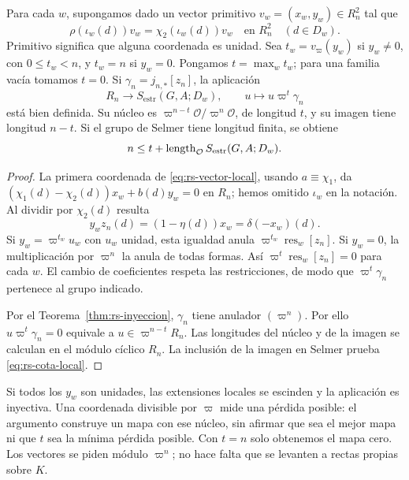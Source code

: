 \begin{proposicion}
\label{prop:rs-local}
Para cada $w$, supongamos dado un vector primitivo
$v_w=(x_w,y_w)\in R_n^2$ tal que
\begin{equation}
 \rho(\iota_w(d))v_w=\chi_2(\iota_w(d))v_w
       \quad\text{en }R_n^2\quad(d\in D_w).
 \label{eq:rs-vector-local}
\end{equation}
Primitivo significa que alguna coordenada es unidad. Sea
$t_w=v_\varpi(y_w)$ si $y_w\ne0$, con $0\le t_w<n$,
y $t_w=n$ si $y_w=0$. Pongamos $t=\max_w t_w$;
para una familia vacía tomamos $t=0$. Si
$\gamma_n=j_{n,*}[z_n]$, la aplicación
\begin{equation}
 R_n\longrightarrow S_{\mathrm{estr}}(G,A;D_w),\qquad
 u\longmapsto u\varpi^t\gamma_n
 \label{eq:rs-mapa-selmer}
\end{equation}
está bien definida. Su núcleo es
$\varpi^{n-t}\mathcal O/\varpi^n\mathcal O$, de longitud $t$,
y su imagen tiene longitud $n-t$. Si el grupo de Selmer tiene
longitud finita, se obtiene
\begin{equation}
 n\le t+\operatorname{length}_{\mathcal O}S_{\mathrm{estr}}(G,A;D_w).
 \label{eq:rs-cota-local}
\end{equation}
\end{proposicion}

\begin{proof}
La primera coordenada de \eqref{eq:rs-vector-local}, usando
$a\equiv\chi_1$, da
$(\chi_1(d)-\chi_2(d))x_w+b(d)y_w=0$ en $R_n$;
hemos omitido $\iota_w$ en la notación. Al dividir por
$\chi_2(d)$ resulta
\begin{equation}
 y_w z_n(d)=(1-\eta(d))x_w=\delta(-x_w)(d).
 \label{eq:rs-coborde-local}
\end{equation}
Si $y_w=\varpi^{t_w}u_w$ con $u_w$ unidad, esta igualdad
anula $\varpi^{t_w}\operatorname{res}_w[z_n]$.
Si $y_w=0$, la multiplicación por $\varpi^n$ la anula de todas
formas. Así $\varpi^t\operatorname{res}_w[z_n]=0$ para cada $w$.
El cambio de coeficientes respeta las restricciones, de modo que
$\varpi^t\gamma_n$ pertenece al grupo indicado.

Por el Teorema~\ref{thm:rs-inyeccion}, $\gamma_n$ tiene anulador
$(\varpi^n)$. Por ello
$u\varpi^t\gamma_n=0$ equivale a
$u\in\varpi^{n-t}R_n$. Las longitudes del núcleo y de la imagen
se calculan en el módulo cíclico $R_n$. La inclusión de la imagen
en Selmer prueba \eqref{eq:rs-cota-local}.
\end{proof}

Si todos los $y_w$ son unidades, las extensiones locales se
escinden y la aplicación es inyectiva. Una coordenada divisible
por $\varpi$ mide una pérdida posible: el argumento construye
un mapa con ese núcleo, sin afirmar que sea el mejor mapa ni que
$t$ sea la mínima pérdida posible. Con $t=n$ solo obtenemos
el mapa cero. Los vectores se piden módulo $\varpi^n$; no hace
falta que se levanten a rectas propias sobre $K$.

